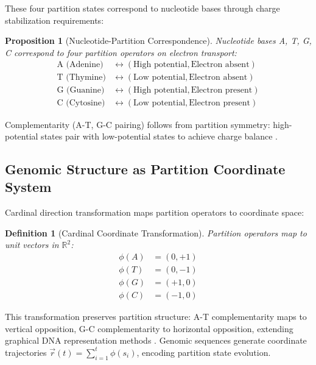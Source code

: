 \documentclass[11pt,a4paper]{article}
\newtheorem{definition}[theorem]{Definition}
\newtheorem{proposition}[theorem]{Proposition}
\theoremstyle{remark}
\begin{document}
These four partition states correspond to nucleotide bases through charge stabilization requirements:

\begin{proposition}[Nucleotide-Partition Correspondence]
\label{prop:nucleotide_partition}
Nucleotide bases A, T, G, C correspond to four partition operators on electron transport:
\begin{align}
\text{A (Adenine)} &\leftrightarrow (\text{High potential}, \text{Electron absent}) \\
\text{T (Thymine)} &\leftrightarrow (\text{Low potential}, \text{Electron absent}) \\
\text{G (Guanine)} &\leftrightarrow (\text{High potential}, \text{Electron present}) \\
\text{C (Cytosine)} &\leftrightarrow (\text{Low potential}, \text{Electron present})
\end{align}
\end{proposition}

Complementarity (A-T, G-C pairing) follows from partition symmetry: high-potential states pair with low-potential states to achieve charge balance \citep{watson1953molecular, travers2015dna}.

\subsection{Genomic Structure as Partition Coordinate System}

Cardinal direction transformation maps partition operators to coordinate space:

\begin{definition}[Cardinal Coordinate Transformation]
\label{def:cardinal_transform}
Partition operators map to unit vectors in $\mathbb{R}^2$:
\begin{align}
\phi(A) &= (0, +1) \\
\phi(T) &= (0, -1) \\
\phi(G) &= (+1, 0) \\
\phi(C) &= (-1, 0)
\end{align}
\end{definition}

This transformation preserves partition structure: A-T complementarity maps to vertical opposition, G-C complementarity to horizontal opposition, extending graphical DNA representation methods \citep{nandy2006graphical, randic2003novel, yau2003dna}. Genomic sequences generate coordinate trajectories $\vec{r}(t) = \sum_{i=1}^t \phi(s_i)$, encoding partition state evolution.
\end{document}
